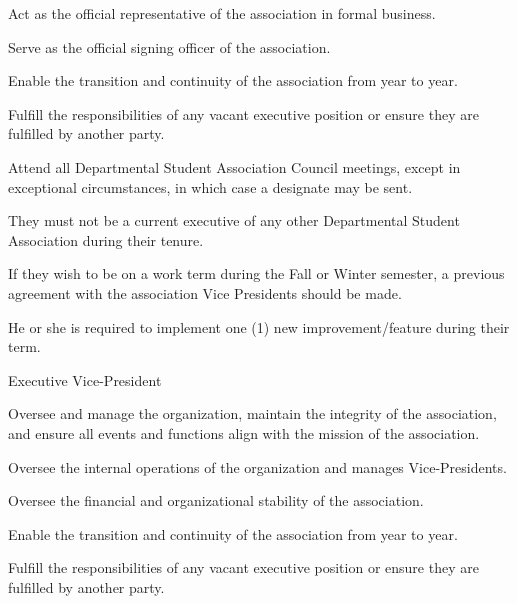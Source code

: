 \documentclass[12pt,a4paper]{article}
\begin{document}
\begin{constitutionlist}
\begin{constitutionlist}
\begin{constitutionlist}
\item Act as the official representative of the association in formal business.

\item Serve as the official signing officer of the association.

\item Enable the transition and continuity of the association from year to year.

\item Fulfill the responsibilities of any vacant executive position or ensure they are fulfilled by another party.

\item Attend all Departmental Student Association Council meetings, except in exceptional circumstances, in which case a designate may be sent.

\item They must not be a current executive of any other Departmental Student Association during their tenure.

\item If they wish to be on a work term during the Fall or Winter semester, a previous agreement with the association Vice Presidents should be made.

\item He or she is required to implement one (1) new improvement/feature during their term.
\end{constitutionlist}

\item Executive Vice-President

\begin{constitutionlist}
\item Oversee and manage the organization, maintain the integrity of the association, and ensure all events and functions align with the mission of the association.

\item Oversee the internal operations of the organization and manages Vice-Presidents.

\item Oversee the financial and organizational stability of the association.

\item Enable the transition and continuity of the association from year to year.

\item Fulfill the responsibilities of any vacant executive position or ensure they are fulfilled by another party.


\end{constitutionlist}
\end{constitutionlist}
\end{constitutionlist}
\end{document}
